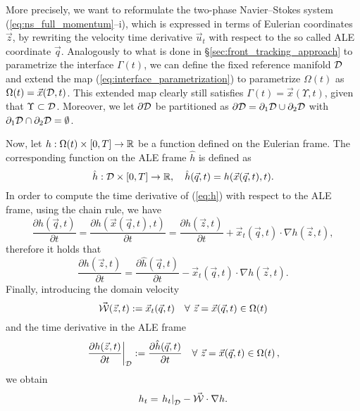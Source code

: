 More precisely, we want to reformulate the two-phase Navier--Stokes system
(\ref{eq:ns_full_momentum}--i), which is expressed in terms of Eulerian
coordinates $\vec z$, by rewriting the velocity time derivative $\vec u_t$ with
respect to the so called ALE coordinate $\vec q$. Analogously to what is done
in \S\ref{sec:front_tracking_approach} to parametrize the interface
$\Gamma(t)$, we can define the fixed reference manifold $\mathcal D$ and extend the map
(\ref{eq:interface_parametrization}) to parametrize $\Omega(t)$ as
$\Omega(t)=\vec x(\mathcal D,t)$. This extended map clearly still satisfies $\Gamma(t)
= \vec x(\Upsilon,t)$, given that $\Upsilon\subset\mathcal D$. Moreover, we let
$\partial\mathcal D$ be partitioned as ${\partial\mathcal D=\partial_1\mathcal D \cup \partial_2\mathcal D}$
with $\partial_1\mathcal D \cap \partial_2\mathcal D = \emptyset$.

Now, let $h:\Omega(t)\times [0,T]\to \mathbb R$ be a function defined on the Eulerian
frame. The corresponding function on the ALE frame $\hat h$ is defined as
\begin{equation}\label{eq:h}
\hat h:\mathcal D\times [0,T]\to \mathbb R,\quad \hat h(\vec q,t)=h(\vec x(\vec q,t),t).
\end{equation}
In order to compute the time derivative of (\ref{eq:h}) with respect to the ALE
frame, using the chain rule, we have
\begin{equation}
\frac{\partial\hat h(\vec q,t)}{\partial t}=\frac{\partial h(\vec x(\vec
q,t),t)}{\partial t}=\frac{\partial h(\vec z,t)}{\partial t}+\vec x_t(\vec q,t)
\cdot \nabla h(\vec z,t),
\end{equation}
therefore it holds that
\begin{equation}
\frac{\partial h(\vec z,t)}{\partial t} =
\frac{\partial\hat h(\vec q,t)}{\partial t}-
\vec x_t(\vec q,t) \cdot \nabla h(\vec z,t).
\end{equation}
Finally, introducing the domain velocity
\begin{equation} \label{eq:W}
\vec{\mathcal W}(\vec z, t) := \vec x_t(\vec q, t) \quad \forall\ \vec z = \vec x(\vec q,t)
\in \Omega(t)
\end{equation}
and the time derivative in the ALE frame
\begin{equation} \label{eq:ale_derivative}
\left.\frac{\partial h(\vec z,t)}{\partial t}\right|_{\mathcal D}:=
\frac{\partial\hat h(\vec q,t)}{\partial t} \quad
\forall\ \vec z = \vec x(\vec q,t) \in \Omega(t)\,,
\end{equation}
we obtain
\begin{equation}\label{eq:ale_dt}
h_t =\left.h_t\right|_{\mathcal D} -\vec{\mathcal{W}} \cdot \nabla h.
\end{equation}

